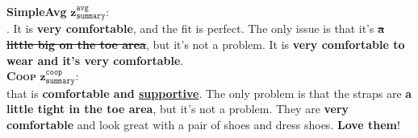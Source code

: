 \documentclass[11pt]{article}
\newcommand{\aggname}{\textsc{Coop}}
\newcommand{\name}{\mbox{\sc BiMeanVAE}}
\newcommand{\simpleavg}{\mbox{SimpleAvg}}
\newcommand{\amazon}{\mbox{\bf Amazon}}
\newcommand\two[1]{\textcolor{c2}{\textbf{#1}}}
\newcommand\three[1]{\textcolor{c3}{\textbf{#1}}}
\newcommand\four[1]{\textcolor{c4}{\textbf{#1}}}
\begin{document}
\begin{figure*}[th]
\begin{mdframed}
        

        \textbf{SimpleAvg} $\boldsymbol{z}_{\texttt{summary}}^{\texttt{avg}}$:\\
        . It is \two{very comfortable}, and the fit is perfect. The only issue is that it's {\color{red}\bf\sout{a little big on the toe area}}, but it's not a problem. It is \two{very comfortable to wear and it's very comfortable}.\\
        
        \textbf{\aggname{}} $\boldsymbol{z}_{\texttt{summary}}^{\texttt{coop}}$:\\
         that is \two{comfortable and \underline{supportive}}. The only problem is that the straps are \three{a little tight in the toe area}, but it's not a problem. They are \two{very comfortable} and look great with a pair of shoes and dress shoes. \four{Love them}!\\
        \end{mdframed}
    \caption{Example of summaries generated by \name{} with \simpleavg{} and \aggname{} for reviews about a product on the \amazon{} dataset.
    The colors denote the corresponding opinions, and struck-through reviews in gray were not selected by \aggname{} for summary generation (Note that \simpleavg{} uses all the input reviews.) Terms that are more specific to the entity are underlined. Red and struck-through text denotes hallucinated content that has the opposite meaning compared to the input.}
    \label{fig:example-amazon}
\end{figure*}
\end{document}
